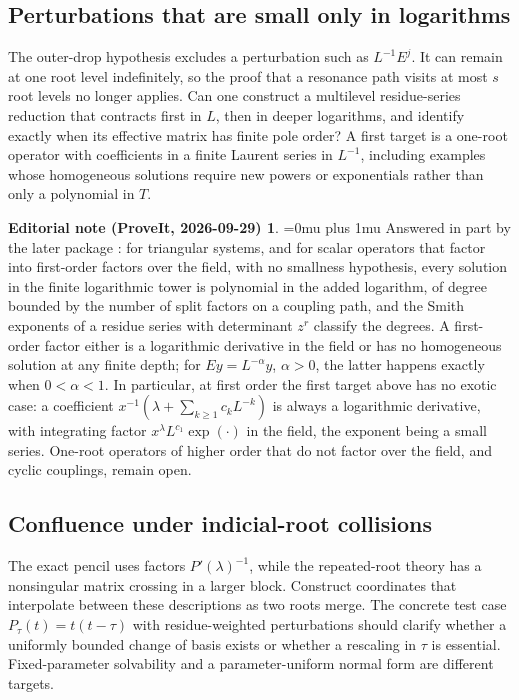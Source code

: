 \documentclass[11pt,a4paper]{article}
\numberwithin{equation}{section}
\theoremstyle{definition}
\theoremstyle{remark}
\theoremstyle{definition}
\newtheorem*{ednoteinner}{Editorial note (ProveIt, 2026-09-29)}
\newenvironment{ednote}{\begin{ednoteinner}\sloppy\Urlmuskip=0mu plus 1mu\relax}{\end{ednoteinner}}
\begin{document}
\subsection{Perturbations that are small only in logarithms}
The outer-drop hypothesis excludes a perturbation such as $L^{-1}E^j$. It can remain at one root level indefinitely, so the proof that a resonance path visits at most $s$ root levels no longer applies. Can one construct a multilevel residue-series reduction that contracts first in $L$, then in deeper logarithms, and identify exactly when its effective matrix has finite pole order? A first target is a one-root operator with coefficients in a finite Laurent series in $L^{-1}$, including examples whose homogeneous solutions require new powers or exponentials rather than only a polynomial in $T$.

\begin{ednote}
Answered in part by the later package \cite{ed:tri}: for triangular systems, and for scalar operators that factor into first-order factors over the field, with no smallness hypothesis, every solution in the finite logarithmic tower is polynomial in the added logarithm, of degree bounded by the number of split factors on a coupling path, and the Smith exponents of a residue series with determinant \(z^r\) classify the degrees. A first-order factor either is a logarithmic derivative in the field or has no homogeneous solution at any finite depth; for \(Ey=L^{-\alpha}y\), \(\alpha>0\), the latter happens exactly when \(0<\alpha<1\). In particular, at first order the first target above has no exotic case: a coefficient \(x^{-1}(\lambda+\sum_{k\ge1}c_kL^{-k})\) is always a logarithmic derivative, with integrating factor \(x^{\lambda}L^{c_1}\exp(\cdot)\) in the field, the exponent being a small series. One-root operators of higher order that do not factor over the field, and cyclic couplings, remain open.
\end{ednote}

\subsection{Confluence under indicial-root collisions}
The exact pencil uses factors $P'(\lambda)^{-1}$, while the repeated-root theory has a nonsingular matrix crossing in a larger block. Construct coordinates that interpolate between these descriptions as two roots merge. The concrete test case $P_\tau(t)=t(t-\tau)$ with residue-weighted perturbations should clarify whether a uniformly bounded change of basis exists or whether a rescaling in $\tau$ is essential. Fixed-parameter solvability and a parameter-uniform normal form are different targets.
\end{document}
